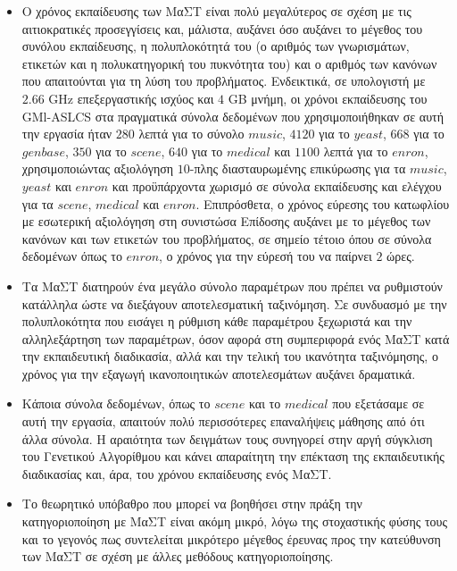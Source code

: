 \begin{itemize}
\item Ο χρόνος εκπαίδευσης των ΜαΣΤ είναι πολύ μεγαλύτερος σε σχέση με τις αιτιοκρατικές προσεγγίσεις και, μάλιστα, αυξάνει όσο αυξάνει το μέγεθος του συνόλου εκπαίδευσης, η πολυπλοκότητά του (ο αριθμός των γνωρισμάτων, ετικετών και η πολυκατηγορική του πυκνότητα του) και ο αριθμός των κανόνων που απαιτούνται για τη λύση του προβλήματος. Ενδεικτικά, σε υπολογιστή με $2.66$ GHz επεξεργαστικής ισχύος και $4$ GB μνήμη, οι χρόνοι εκπαίδευσης του GMl-ASLCS στα πραγματικά σύνολα δεδομένων που χρησιμοποιήθηκαν σε αυτή την εργασία ήταν $280$ λεπτά για το σύνολο $music$, $4120$ για το $yeast$, $668$ για το $genbase$, $350$ για το $scene$, $640$ για το $medical$ και $1100$ λεπτά για το $enron$, χρησιμοποιώντας αξιολόγηση $10$-πλης διασταυρωμένης επικύρωσης για τα $music$, $yeast$ και $enron$ και προϋπάρχοντα χωρισμό σε σύνολα εκπαίδευσης και ελέγχου για τα $scene$, $medical$ και $enron$. Επιπρόσθετα, ο χρόνος εύρεσης του κατωφλίου με εσωτερική αξιολόγηση στη συνιστώσα Επίδοσης αυξάνει με το μέγεθος των κανόνων και των ετικετών του προβλήματος, σε σημείο τέτοιο όπου σε σύνολα δεδομένων όπως το $enron$, ο χρόνος για την εύρεσή του να παίρνει $2$ ώρες.

\item Τα ΜαΣΤ διατηρούν ένα μεγάλο σύνολο παραμέτρων που πρέπει να ρυθμιστούν κατάλληλα ώστε να διεξάγουν αποτελεσματική ταξινόμηση. Σε συνδυασμό με την πολυπλοκότητα που εισάγει η ρύθμιση κάθε παραμέτρου ξεχωριστά και την αλληλεξάρτηση των παραμέτρων, όσον αφορά στη συμπεριφορά ενός ΜαΣΤ κατά την εκπαιδευτική διαδικασία, αλλά και την τελική του ικανότητα ταξινόμησης, ο χρόνος για την εξαγωγή ικανοποιητικών αποτελεσμάτων αυξάνει δραματικά.

\item Κάποια σύνολα δεδομένων, όπως το $scene$ και το $medical$ που εξετάσαμε σε αυτή την εργασία, απαιτούν πολύ περισσότερες επαναλήψεις μάθησης από ότι άλλα σύνολα. Η αραιότητα των δειγμάτων τους συνηγορεί στην αργή σύγκλιση του Γενετικού Αλγορίθμου και κάνει απαραίτητη την επέκταση της εκπαιδευτικής διαδικασίας και, άρα, του χρόνου εκπαίδευσης ενός ΜαΣΤ.

\item Το θεωρητικό υπόβαθρο που μπορεί να βοηθήσει στην πράξη την κατηγοριοποίηση με ΜαΣΤ είναι ακόμη μικρό, λόγω της στοχαστικής φύσης τους και το γεγονός πως συντελείται μικρότερο μέγεθος έρευνας προς την κατεύθυνση των ΜαΣΤ σε σχέση με άλλες μεθόδους κατηγοριοποίησης.


\end{itemize}
